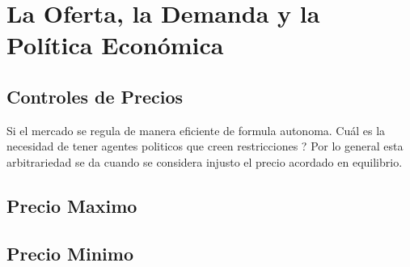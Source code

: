  \newpage

\section{La Oferta, la Demanda y la Política Económica}

\subsection{Controles de Precios}
Si el mercado se regula de manera eficiente de formula autonoma. Cuál es la necesidad de tener agentes politicos que creen restricciones ?
Por lo general esta arbitrariedad se da cuando se considera injusto el precio acordado en equilibrio.
\subsection{Precio Maximo}
\subsection{Precio Minimo}

